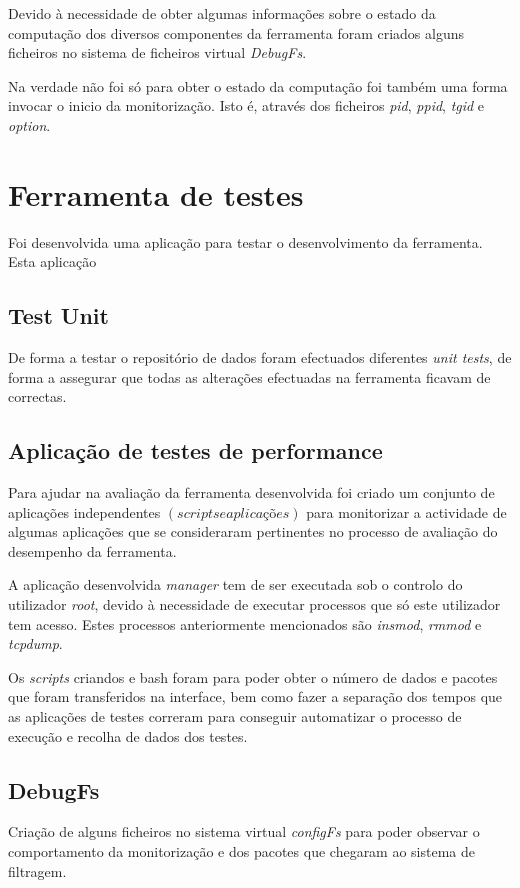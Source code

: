 Devido à necessidade de obter algumas informações sobre o estado da computação
dos diversos componentes da ferramenta foram criados alguns ficheiros no
sistema de ficheiros virtual \textit{DebugFs}.

Na verdade não foi só para obter o estado da computação foi também uma forma
invocar o inicio da monitorização. Isto é, através dos ficheiros \textit{pid},
\textit{ppid}, \textit{tgid} e \textit{option}. 

\section{Ferramenta de testes}

Foi desenvolvida uma aplicação para testar o desenvolvimento da ferramenta.
Esta aplicação 

\subsection{Test Unit}

De forma a testar o repositório de dados foram efectuados diferentes
\textit{unit tests}, de forma a assegurar que todas as alterações efectuadas na
ferramenta ficavam de correctas.

\subsection{Aplicação de testes de performance}

Para ajudar na avaliação da ferramenta desenvolvida foi criado um conjunto de
aplicações independentes $\left( scripts e aplicações \right)$ para monitorizar
a actividade de algumas aplicações que se consideraram pertinentes no processo
de avaliação do desempenho da ferramenta.

A aplicação desenvolvida \textit{manager} tem de ser executada sob o controlo
do utilizador \textit{root}, devido à necessidade de executar processos que só
este utilizador tem acesso. Estes processos anteriormente mencionados são
\textit{insmod}, \textit{rmmod} e \textit{tcpdump}.

Os \textit{scripts} criandos e bash foram para poder obter o número de dados e
pacotes que foram transferidos na interface, bem como fazer a separação dos
tempos que as aplicações de testes correram para conseguir automatizar o
processo de execução e recolha de dados dos testes.

\subsection{DebugFs}

Criação de alguns ficheiros no sistema virtual \textit{configFs} para poder
observar o comportamento da monitorização e dos pacotes que chegaram ao sistema
de filtragem.